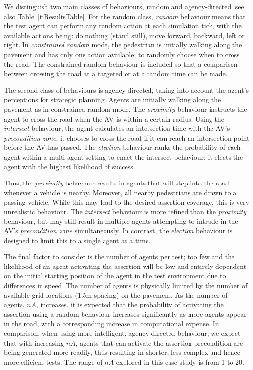 \documentclass[letterpaper, 10 pt, journal, twoside]{IEEEtran}
\begin{document}
We distinguish two main classes of behaviours, random and agency-directed, see also Table~\ref{t:ResultsTable}. For the random class, \textit{random} behaviour means that the test agent can perform any random action at each simulation tick, with the available actions being: do nothing (stand still), move forward, backward, left or right. In \textit{constrained random} mode, the pedestrian is initially walking along the pavement and has only one action available; to randomly choose when to cross the road. The constrained random behaviour is included so that a comparison between crossing the road at a targeted or at a random time can be made. 

The second class of behaviours is agency-directed, taking into account the agent's perceptions for strategic planning. Agents are initially walking along the pavement as in constrained random mode. The \textit{proximity} behaviour instructs the agent to cross the road when the AV is within a certain radius. Using the \textit{intersect} behaviour, the agent calculates an intersection time with the AV's \textit{precondition zone}; it chooses to cross the road if it can reach an intersection point before the AV has passed. The \textit{election} behaviour ranks the probability of each agent within a multi-agent setting to enact the intersect behaviour; it elects the agent with the highest likelihood of success.

Thus, the \textit{proximity} behaviour results in agents that will step into the road whenever a vehicle is nearby. Moreover, all nearby pedestrians are drawn to a passing vehicle.
%
While this may lead to the desired assertion coverage, this is very unrealistic behaviour. 
%
The \textit{intersect} behaviour is more refined than the \textit{proximity} behaviour, but may still result in multiple agents attempting to intrude in the AV's \textit{precondition zone} simultaneously. 
%
In contrast, the \textit{election} behaviour is designed to limit this to a single agent at a time.

The final factor to consider is the number of agents per test; too few and the likelihood of an agent activating the assertion will be low and entirely dependent on the initial starting position of the agent in the test environment due to differences in speed. The number of agents is physically limited by the number of available grid locations (1.5m spacing) on the pavement. %
%
As the number of agents, $nA$, increases, it is expected that the probability of activating the assertion using a random behaviour increases significantly as more agents appear in the road, with a corresponding increase in computational expense. 
%
In comparison, when using more intelligent, agency-directed behaviour, we expect that with increasing $nA$, agents that can activate the assertion precondition are being generated more readily, thus resulting in shorter, less complex and hence more efficient tests. The range of $nA$ explored in this case study is from 1 to 20.
\end{document}
